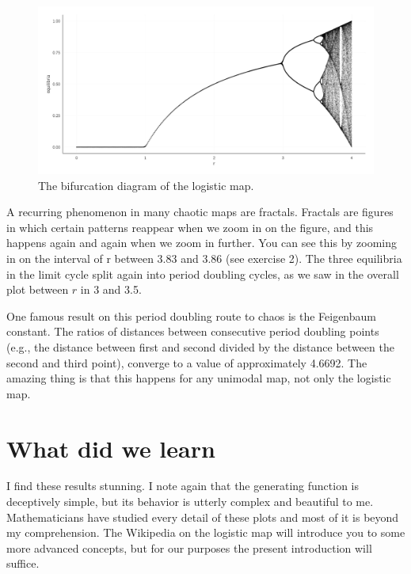 \documentclass[
  a4paper,
  DIV=11,
  numbers=noendperiod,
  oneside]{scrreprt}
\begin{document}
\begin{figure}

{\centering \includegraphics{media/ch2/fig-ch2-img8.jpg}

}

\caption{\label{fig-ch2-img8}The bifurcation diagram of the logistic
map.}

\end{figure}

A recurring phenomenon in many chaotic maps are fractals. Fractals are
figures in which certain patterns reappear when we zoom in on the
figure, and this happens again and again when we zoom in further. You
can see this by zooming in on the interval of r between 3.83 and 3.86
(see exercise 2). The three equilibria in the limit cycle split again
into period doubling cycles, as we saw in the overall plot between \(r\)
in 3 and 3.5.

One famous result on this period doubling route to chaos is the
Feigenbaum constant. The ratios of distances between consecutive period
doubling points (e.g., the distance between first and second divided by
the distance between the second and third point), converge to a value of
approximately 4.6692. The amazing thing is that this happens for any
unimodal map, not only the logistic map.

\hypertarget{sec-What-did-we-learn}{%
\section{What did we learn}\label{sec-What-did-we-learn}}

I find these results stunning. I note again that the generating function
is deceptively simple, but its behavior is utterly complex and beautiful
to me. Mathematicians have studied every detail of these plots and most
of it is beyond my comprehension. The Wikipedia on the logistic map will
introduce you to some more advanced concepts, but for our purposes the
present introduction will suffice.
\end{document}
